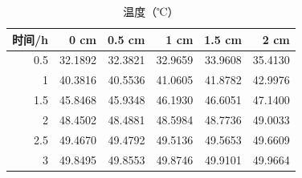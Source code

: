 \begin{table}[htbp]
\centering
\caption{温度（℃）}
\label{tab:q2-3}
\begin{tabular}{rrrrrr}
\hline
时间/h & 0 cm & 0.5 cm & 1 cm & 1.5 cm & 2 cm \\
\hline
0.5 & 32.1892 & 32.3821 & 32.9659 & 33.9608 & 35.4130 \\
1 & 40.3816 & 40.5536 & 41.0605 & 41.8782 & 42.9976 \\
1.5 & 45.8468 & 45.9348 & 46.1930 & 46.6051 & 47.1400 \\
2 & 48.4502 & 48.4881 & 48.5984 & 48.7736 & 49.0033 \\
2.5 & 49.4670 & 49.4792 & 49.5136 & 49.5653 & 49.6609 \\
3 & 49.8495 & 49.8553 & 49.8746 & 49.9101 & 49.9664 \\
\hline
\end{tabular}
\end{table}

